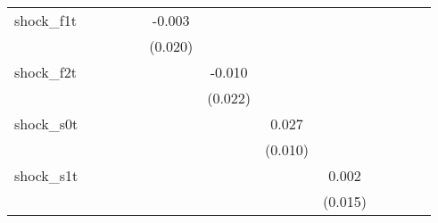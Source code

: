 {\begin{tabular}{l*{12}{c}}
\addlinespace
shock\_f1t   &                     &                     &                     &                     &      -0.003         &                     &                     &                     &                     &                     &                     &                     \\
            &                     &                     &                     &                     &     (0.020)         &                     &                     &                     &                     &                     &                     &                     \\
\addlinespace
shock\_f2t   &                     &                     &                     &                     &                     &      -0.010         &                     &                     &                     &                     &                     &                     \\
            &                     &                     &                     &                     &                     &     (0.022)         &                     &                     &                     &                     &                     &                     \\
\addlinespace
shock\_s0t   &                     &                     &                     &                     &                     &                     &       0.027\sym{**} &                     &                     &                     &                     &                     \\
            &                     &                     &                     &                     &                     &                     &     (0.010)         &                     &                     &                     &                     &                     \\
\addlinespace
shock\_s1t   &                     &                     &                     &                     &                     &                     &                     &       0.002         &                     &                     &                     &                     \\
            &                     &                     &                     &                     &                     &                     &                     &     (0.015)         &                     &                     &                     &                     \\

\end{tabular}}
